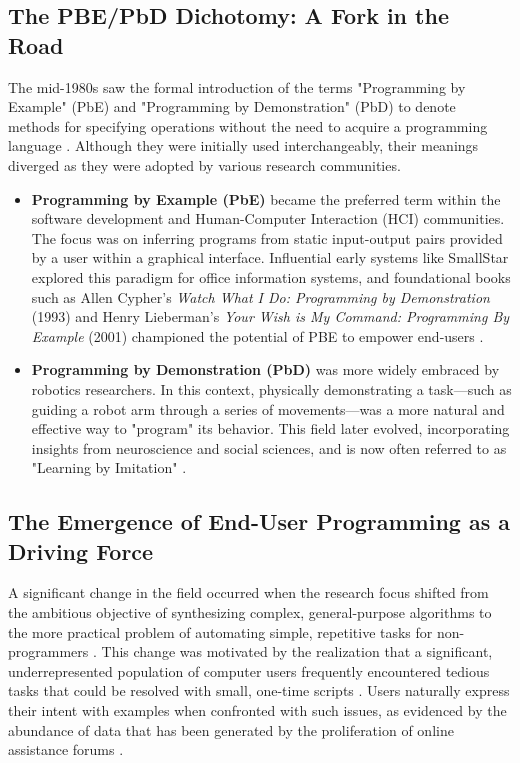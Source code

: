 \documentclass[12pt, a4paper]{report}
\begin{document}
\subsection{The PBE/PbD Dichotomy: A Fork in the Road}

The mid-1980s saw the formal introduction of the terms "Programming by Example" (PbE) and "Programming by Demonstration" (PbD) to denote methods for specifying operations without the need to acquire a programming language \citep{cypher1993watch}.  Although they were initially used interchangeably, their meanings diverged as they were adopted by various research communities.

\begin{itemize}
    \item \textbf{Programming by Example (PbE)} became the preferred term within the software development and Human-Computer Interaction (HCI) communities. The focus was on inferring programs from static input-output pairs provided by a user within a graphical interface. Influential early systems like SmallStar explored this paradigm for office information systems, and foundational books such as Allen Cypher's \textit{Watch What I Do: Programming by Demonstration} (1993) and Henry Lieberman's \textit{Your Wish is My Command: Programming By Example} (2001) championed the potential of PBE to empower end-users \citep{cypher1993watch, lieberman2001your}.
    \item \textbf{Programming by Demonstration (PbD)} was more widely embraced by robotics researchers. In this context, physically demonstrating a task—such as guiding a robot arm through a series of movements—was a more natural and effective way to "program" its behavior. This field later evolved, incorporating insights from neuroscience and social sciences, and is now often referred to as "Learning by Imitation" \citep{argall2009survey}.
\end{itemize}

\subsection{The Emergence of End-User Programming as a Driving Force}

A significant change in the field occurred when the research focus shifted from the ambitious objective of synthesizing complex, general-purpose algorithms to the more practical problem of automating simple, repetitive tasks for non-programmers \citep{gulwani2012dimensions, gulwani2017program}.  This change was motivated by the realization that a significant, underrepresented population of computer users frequently encountered tedious tasks that could be resolved with small, one-time scripts \citep{gulwani2011automating}.  Users naturally express their intent with examples when confronted with such issues, as evidenced by the abundance of data that has been generated by the proliferation of online assistance forums \citep{gulwani2012dimensions}.
\end{document}
